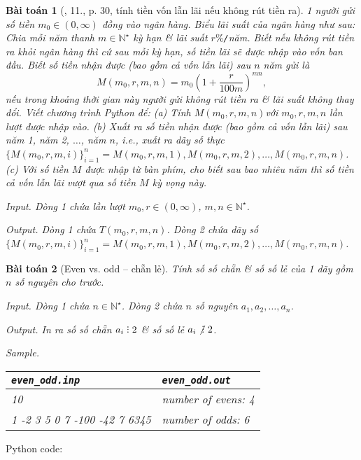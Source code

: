 \documentclass{article}
\newtheorem{baitoan}{Bài toán}
\DeclareRobustCommand{\divby}{%
	\mathrel{\vbox{\baselineskip.65ex\lineskiplimit0pt\hbox{.}\hbox{.}\hbox{.}}}%
}
\begin{document}
\begin{baitoan}[\cite{CDHT_Toan_10_CD}, 11., p. 30, tính tiền vốn lẫn lãi nếu không rút tiền ra]
	1 người gửi số tiền $m_0\in(0,\infty)$ đồng vào ngân hàng. Biểu lãi suất của ngân hàng như sau: Chia mỗi năm thanh $m\in\mathbb{N}^\star$ kỳ hạn \& lãi suất $r\%${\tt/}năm. Biết nếu không rút tiền ra khỏi ngân hàng thì cứ sau mỗi kỳ hạn, số tiền lãi sẽ được nhập vào vốn ban đầu. Biết số tiền nhận được (bao gồm cả vốn lẫn lãi) sau $n$ năm gửi là
	\begin{equation*}
		M(m_0,r,m,n) = m_0\left(1 + \frac{r}{100m}\right)^{mn},
	\end{equation*}
	nếu trong khoảng thời gian này người gửi không rút tiền ra \& lãi suất không thay đổi. Viết chương trình Python để: (a) Tính $M(m_0,r,m,n)$với $m_0,r,m,n$ lần lượt được nhập vào. (b) Xuất ra số tiền nhận được (bao gồm cả vốn lẫn lãi) sau năm 1, năm 2, $\ldots$, năm $n$, i.e., xuất ra dãy số thực $\{M(m_0,r,m,i)\}_{i=1}^n = M(m_0,r,m,1),M(m_0,r,m,2),\ldots,M(m_0,r,m,n)$. (c) Với số tiền $M$ được nhập từ bàn phím, cho biết sau bao nhiêu năm thì số tiền cả vốn lẫn lãi vượt qua số tiền $M$ kỳ vọng này.
	\item {\sf Input.} Dòng 1 chứa lần lượt $m_0,r\in(0,\infty)$, $m,n\in\mathbb{N}^\star$.
	\item {\sf Output.} Dòng 1 chứa $T(m_0,r,m,n)$. Dòng 2 chứa dãy số $\{M(m_0,r,m,i)\}_{i=1}^n = M(m_0,r,m,1),M(m_0,r,m,2),\ldots,M(m_0,r,m,n)$.
\end{baitoan}

\begin{baitoan}[Even vs. odd -- chẵn lẻ]
	Tính số số chẵn \& số số lẻ của 1 dãy gồm $n$ số nguyên cho trước.
	\item {\sf Input.} Dòng 1 chứa $n\in\mathbb{N}^\star$. Dòng 2 chứa $n$ số nguyên $a_1,a_2,\ldots,a_n$.
	\item {\sf Output.} In ra số số chẵn $a_i\divby2$ \& số số lẻ $a_i\not{\divby}\ 2$.
	\item {\sf Sample.}
	\begin{table}[H]
		\centering
		\begin{tabular}{|l|l|}
			\hline
			\verb|even_odd.inp| & \verb|even_odd.out| \\
			\hline
			10 &  number of evens: 4 \\
			1 -2 3 5 0 7 -100 -42 7 6345 & number of odds: 6 \\
			\hline
		\end{tabular}
	\end{table}	
\end{baitoan}
Python code:
\begin{verbatim}

\end{verbatim}
\end{document}
